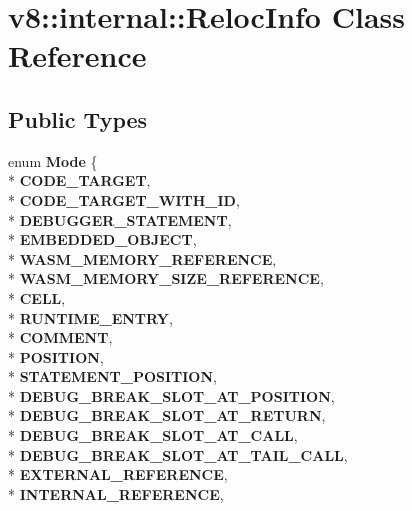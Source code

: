 \hypertarget{classv8_1_1internal_1_1_reloc_info}{}\section{v8\+:\+:internal\+:\+:Reloc\+Info Class Reference}
\label{classv8_1_1internal_1_1_reloc_info}
\subsection*{Public Types}
\begin{DoxyCompactItemize}
\item 
enum {\bfseries Mode} \{ \\*
{\bfseries C\+O\+D\+E\+\_\+\+T\+A\+R\+G\+ET}, 
\\*
{\bfseries C\+O\+D\+E\+\_\+\+T\+A\+R\+G\+E\+T\+\_\+\+W\+I\+T\+H\+\_\+\+ID}, 
\\*
{\bfseries D\+E\+B\+U\+G\+G\+E\+R\+\_\+\+S\+T\+A\+T\+E\+M\+E\+NT}, 
\\*
{\bfseries E\+M\+B\+E\+D\+D\+E\+D\+\_\+\+O\+B\+J\+E\+CT}, 
\\*
{\bfseries W\+A\+S\+M\+\_\+\+M\+E\+M\+O\+R\+Y\+\_\+\+R\+E\+F\+E\+R\+E\+N\+CE}, 
\\*
{\bfseries W\+A\+S\+M\+\_\+\+M\+E\+M\+O\+R\+Y\+\_\+\+S\+I\+Z\+E\+\_\+\+R\+E\+F\+E\+R\+E\+N\+CE}, 
\\*
{\bfseries C\+E\+LL}, 
\\*
{\bfseries R\+U\+N\+T\+I\+M\+E\+\_\+\+E\+N\+T\+RY}, 
\\*
{\bfseries C\+O\+M\+M\+E\+NT}, 
\\*
{\bfseries P\+O\+S\+I\+T\+I\+ON}, 
\\*
{\bfseries S\+T\+A\+T\+E\+M\+E\+N\+T\+\_\+\+P\+O\+S\+I\+T\+I\+ON}, 
\\*
{\bfseries D\+E\+B\+U\+G\+\_\+\+B\+R\+E\+A\+K\+\_\+\+S\+L\+O\+T\+\_\+\+A\+T\+\_\+\+P\+O\+S\+I\+T\+I\+ON}, 
\\*
{\bfseries D\+E\+B\+U\+G\+\_\+\+B\+R\+E\+A\+K\+\_\+\+S\+L\+O\+T\+\_\+\+A\+T\+\_\+\+R\+E\+T\+U\+RN}, 
\\*
{\bfseries D\+E\+B\+U\+G\+\_\+\+B\+R\+E\+A\+K\+\_\+\+S\+L\+O\+T\+\_\+\+A\+T\+\_\+\+C\+A\+LL}, 
\\*
{\bfseries D\+E\+B\+U\+G\+\_\+\+B\+R\+E\+A\+K\+\_\+\+S\+L\+O\+T\+\_\+\+A\+T\+\_\+\+T\+A\+I\+L\+\_\+\+C\+A\+LL}, 
\\*
{\bfseries E\+X\+T\+E\+R\+N\+A\+L\+\_\+\+R\+E\+F\+E\+R\+E\+N\+CE}, 
\\*
{\bfseries I\+N\+T\+E\+R\+N\+A\+L\+\_\+\+R\+E\+F\+E\+R\+E\+N\+CE}, 

\end{DoxyCompactItemize}
